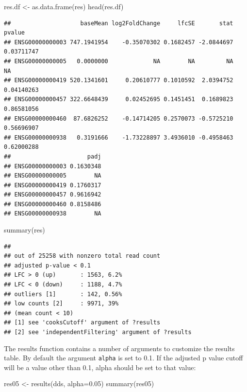 \documentclass[
]{article}
\newenvironment{Shaded}{\begin{snugshade}}{\end{snugshade}}
\newcommand{\AttributeTok}[1]{\textcolor[rgb]{0.77,0.63,0.00}{#1}}
\newcommand{\FloatTok}[1]{\textcolor[rgb]{0.00,0.00,0.81}{#1}}
\newcommand{\FunctionTok}[1]{\textcolor[rgb]{0.00,0.00,0.00}{#1}}
\newcommand{\NormalTok}[1]{#1}
\newcommand{\OtherTok}[1]{\textcolor[rgb]{0.56,0.35,0.01}{#1}}
\begin{document}
\begin{Shaded}
\begin{Highlighting}[]
\NormalTok{res.df }\OtherTok{\textless{}{-}} \FunctionTok{as.data.frame}\NormalTok{(res)}
\FunctionTok{head}\NormalTok{(res.df)}
\end{Highlighting}
\end{Shaded}

\begin{verbatim}
##                    baseMean log2FoldChange     lfcSE       stat     pvalue
## ENSG00000000003 747.1941954    -0.35070302 0.1682457 -2.0844697 0.03711747
## ENSG00000000005   0.0000000             NA        NA         NA         NA
## ENSG00000000419 520.1341601     0.20610777 0.1010592  2.0394752 0.04140263
## ENSG00000000457 322.6648439     0.02452695 0.1451451  0.1689823 0.86581056
## ENSG00000000460  87.6826252    -0.14714205 0.2570073 -0.5725210 0.56696907
## ENSG00000000938   0.3191666    -1.73228897 3.4936010 -0.4958463 0.62000288
##                      padj
## ENSG00000000003 0.1630348
## ENSG00000000005        NA
## ENSG00000000419 0.1760317
## ENSG00000000457 0.9616942
## ENSG00000000460 0.8158486
## ENSG00000000938        NA
\end{verbatim}

\begin{Shaded}
\begin{Highlighting}[]
\FunctionTok{summary}\NormalTok{(res)}
\end{Highlighting}
\end{Shaded}

\begin{verbatim}
## 
## out of 25258 with nonzero total read count
## adjusted p-value < 0.1
## LFC > 0 (up)       : 1563, 6.2%
## LFC < 0 (down)     : 1188, 4.7%
## outliers [1]       : 142, 0.56%
## low counts [2]     : 9971, 39%
## (mean count < 10)
## [1] see 'cooksCutoff' argument of ?results
## [2] see 'independentFiltering' argument of ?results
\end{verbatim}

The results function contains a number of arguments to customize the
results table. By default the argument \texttt{alpha} is set to 0.1. If
the adjusted p value cutoff will be a value other than 0.1, alpha should
be set to that value:

\begin{Shaded}
\begin{Highlighting}[]
\NormalTok{res05 }\OtherTok{\textless{}{-}} \FunctionTok{results}\NormalTok{(dds, }\AttributeTok{alpha=}\FloatTok{0.05}\NormalTok{)}
\FunctionTok{summary}\NormalTok{(res05)}
\end{Highlighting}
\end{Shaded}
\end{document}
